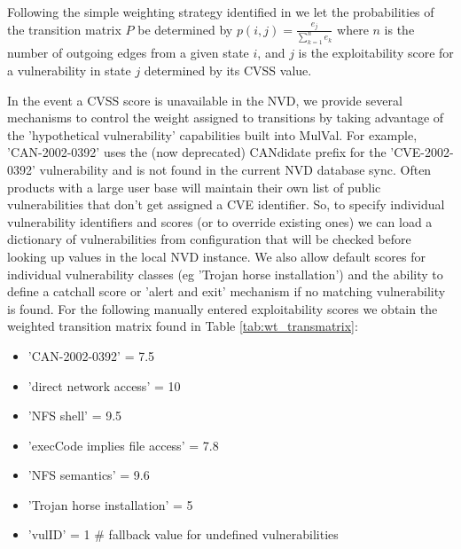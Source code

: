 Following the simple weighting strategy identified in \cite{Abraham_2016} we let the probabilities of the transition matrix $P$ be determined by $p(i,j)= \frac{e_j}{\sum_{k=1}^{n}e_k}$ where $n$ is the number of outgoing edges from a given state $i$, and $j$ is the exploitability score for a vulnerability in state $j$ determined by its CVSS value. 

In the event a CVSS score is unavailable in the NVD, we provide several mechanisms to control the weight assigned to transitions by taking advantage of the 'hypothetical vulnerability' capabilities built into MulVal. For example, 'CAN-2002-0392' uses the (now deprecated) CANdidate prefix for the 'CVE-2002-0392' vulnerability and is not found in the current NVD database sync. Often products with a large user base will maintain their own list of public vulnerabilities that don't get assigned a CVE identifier. So, to specify individual vulnerability identifiers and scores (or to override existing ones) we can load a dictionary of vulnerabilities from configuration that will be checked before looking up values in the local NVD instance. We also allow default scores for individual vulnerability classes (eg 'Trojan horse installation') and the ability to define a catchall score or 'alert and exit' mechanism if no matching vulnerability is found. For the following manually entered exploitability scores we obtain the weighted transition matrix found in Table \ref{tab:wt_transmatrix}:


\begin{itemize}
\item 'CAN-2002-0392' = 7.5
\item 'direct network access' = 10
\item 'NFS shell' = 9.5
\item 'execCode implies file access' = 7.8
\item 'NFS semantics' = 9.6
\item 'Trojan horse installation' = 5
\item 'vulID' = 1 \# fallback value for undefined vulnerabilities
\end{itemize}





